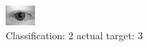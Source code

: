 \begin{figure}[h!]
\begin{center}
\includegraphics[width=0.60\columnwidth]{figures/ID609_class_2_target_3.png}
\end{center}
\caption{ Classification: 2 actual target: 3}
\label{fig:ID609_class_2_target_3}
\end{figure}

